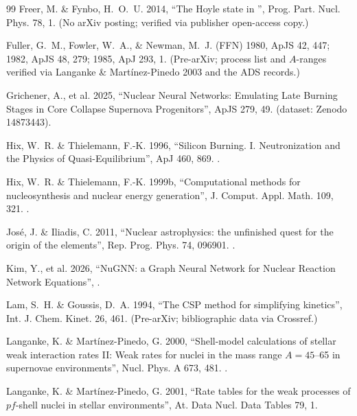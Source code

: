 \begin{thebibliography}{99}
Freer, M. \& Fynbo, H.~O.~U. 2014, ``The Hoyle state in '', Prog.
Part. Nucl. Phys. 78, 1. (No arXiv posting; verified via publisher open-access
copy.)

Fuller, G.~M., Fowler, W.~A., \& Newman, M.~J. (FFN) 1980, ApJS 42, 447; 1982,
ApJS 48, 279; 1985, ApJ 293, 1. (Pre-arXiv; process list and $A$-ranges
verified via Langanke \& Mart\'inez-Pinedo 2003 and the ADS records.)

Grichener, A., et al. 2025, ``Nuclear Neural Networks: Emulating Late Burning
Stages in Core Collapse Supernova Progenitors'', ApJS 279, 49.
 (dataset: Zenodo 14873443).

Hix, W.~R. \& Thielemann, F.-K. 1996, ``Silicon Burning. I. Neutronization and
the Physics of Quasi-Equilibrium'', ApJ 460, 869. .

Hix, W.~R. \& Thielemann, F.-K. 1999b, ``Computational methods for
nucleosynthesis and nuclear energy generation'', J. Comput. Appl. Math. 109,
321. .

Jos\'e, J. \& Iliadis, C. 2011, ``Nuclear astrophysics: the unfinished quest
for the origin of the elements'', Rep. Prog. Phys. 74, 096901.
.

Kim, Y., et al. 2026, ``NuGNN: a Graph Neural Network for Nuclear Reaction
Network Equations'', .

Lam, S.~H. \& Goussis, D.~A. 1994, ``The CSP method for simplifying kinetics'',
Int. J. Chem. Kinet. 26, 461. (Pre-arXiv; bibliographic data via Crossref.)

Langanke, K. \& Mart\'inez-Pinedo, G. 2000, ``Shell-model calculations of
stellar weak interaction rates II: Weak rates for nuclei in the mass range
$A = 45$--65 in supernovae environments'', Nucl. Phys. A 673, 481.
.

Langanke, K. \& Mart\'inez-Pinedo, G. 2001, ``Rate tables for the weak
processes of $pf$-shell nuclei in stellar environments'', At. Data Nucl. Data
Tables 79, 1.


\end{thebibliography}
